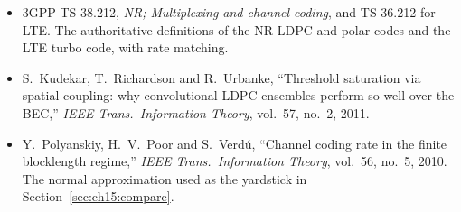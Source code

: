\begin{itemize}
\item 3GPP TS 38.212, \emph{NR; Multiplexing and channel coding}, and TS 36.212 for LTE. The
authoritative definitions of the NR LDPC and polar codes and the LTE turbo code, with rate matching.
\item S.~Kudekar, T.~Richardson and R.~Urbanke, ``Threshold saturation via spatial coupling: why
convolutional LDPC ensembles perform so well over the BEC,'' \emph{IEEE Trans.\ Information
Theory}, vol.~57, no.~2, 2011.
\item Y.~Polyanskiy, H.~V.~Poor and S.~Verd\'u, ``Channel coding rate in the finite blocklength
regime,'' \emph{IEEE Trans.\ Information Theory}, vol.~56, no.~5, 2010. The normal approximation used
as the yardstick in Section~\ref{sec:ch15:compare}.
\end{itemize}
